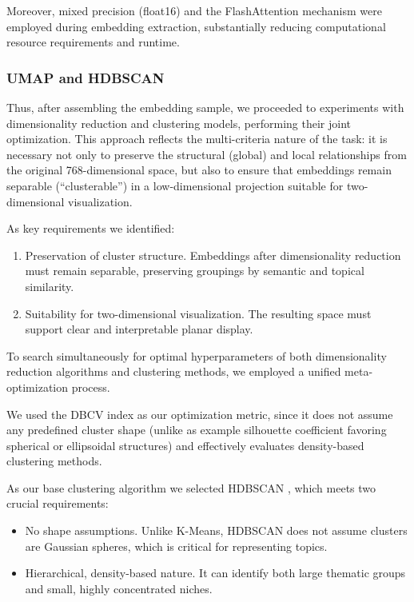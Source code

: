 Moreover, mixed precision (float16) and the FlashAttention mechanism \parencite{flash2022attention} were
employed during embedding extraction, substantially reducing computational resource requirements and runtime.

\subsubsection{UMAP and HDBSCAN}
\label{sec:drc}
Thus, after assembling the embedding sample, we proceeded to experiments with dimensionality reduction and clustering
models, performing their joint optimization. This approach reflects the multi-criteria nature of the task: it is necessary
not only to preserve the structural (global) and local relationships from the original 768-dimensional space, but also
to ensure that embeddings remain separable (“clusterable”) in a low-dimensional projection suitable for two-dimensional
visualization.

As key requirements we identified:

\begin{enumerate}
    \item Preservation of cluster structure. Embeddings after dimensionality reduction must remain separable,
    preserving groupings by semantic and topical similarity.
    \item Suitability for two-dimensional visualization. The resulting space must support clear and interpretable
    planar display.
\end{enumerate}

To search simultaneously for optimal hyperparameters of both dimensionality reduction algorithms and clustering methods,
we employed a unified meta-optimization process.

We used the DBCV index as our optimization metric, since it does not assume any predefined cluster shape (unlike as example
silhouette coefficient favoring spherical or ellipsoidal structures) and effectively evaluates density-based clustering
methods.

As our base clustering algorithm we selected HDBSCAN \parencite{HDBSCAN2013}, which meets two crucial requirements:

\begin{itemize}
    \item No shape assumptions. Unlike K-Means, HDBSCAN does not assume clusters are Gaussian spheres, which is critical
    for representing topics.
    \item Hierarchical, density-based nature. It can identify both large thematic groups and small, highly concentrated niches.
\end{itemize}

